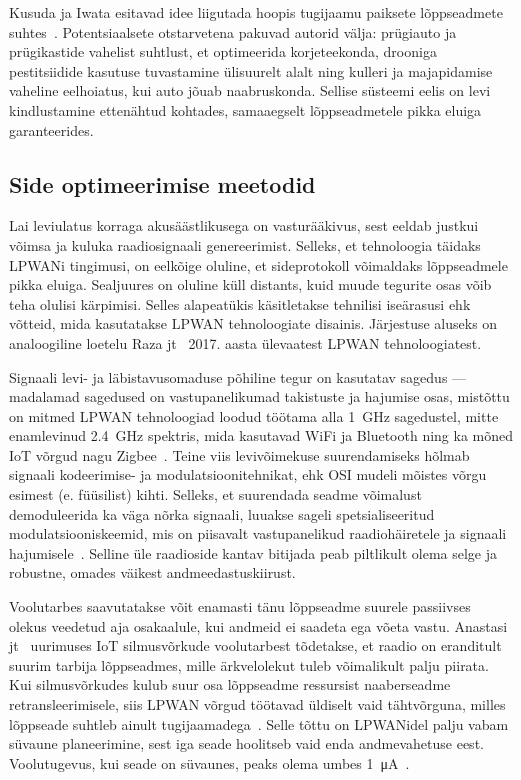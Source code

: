 \documentclass[12pt]{article}
\begin{document}
    Kusuda ja Iwata esitavad idee liigutada hoopis tugijaamu paiksete lõppseadmete suhtes~\cite{kusuda}.
    Potentsiaalsete otstarvetena pakuvad autorid välja: prügiauto ja prügikastide vahelist suhtlust, et optimeerida korjeteekonda, drooniga pestitsiidide kasutuse tuvastamine ülisuurelt alalt ning kulleri ja majapidamise vaheline eelhoiatus, kui auto jõuab naabruskonda.
    Sellise süsteemi eelis on levi kindlustamine ettenähtud kohtades, samaaegselt lõppseadmetele pikka eluiga garanteerides.

    \subsection{Side optimeerimise meetodid}

    Lai leviulatus korraga akusäästlikusega on vasturääkivus, sest eeldab justkui võimsa ja kuluka raadiosignaali genereerimist.
    Selleks, et tehnoloogia täidaks LPWANi tingimusi, on eelkõige oluline, et sideprotokoll võimaldaks lõppseadmele pikka eluiga.
    Sealjuures on oluline küll distants, kuid muude tegurite osas võib teha olulisi kärpimisi.
    Selles alapeatükis käsitletakse tehnilisi iseärasusi ehk võtteid, mida kasutatakse LPWAN tehnoloogiate disainis.
    Järjestuse aluseks on analoogiline loetelu Raza jt~\cite{raza} 2017. aasta ülevaatest LPWAN tehnoloogiatest.

    Signaali levi- ja läbistavusomaduse põhiline tegur on kasutatav sagedus — madalamad sagedused on vastupanelikumad takistuste ja hajumise osas, mistõttu on mitmed LPWAN tehnoloogiad loodud töötama alla \SI{1}{\giga\hertz} sagedustel, mitte enamlevinud \SI{2,4}{\giga\hertz} spektris, mida kasutavad WiFi ja Bluetooth ning ka mõned IoT võrgud nagu Zigbee~\cite{bardyn}.
    Teine viis levivõimekuse suurendamiseks hõlmab signaali kodeerimise- ja modulatsioonitehnikat, ehk OSI mudeli mõistes võrgu esimest (e. füüsilist) kihti. Selleks, et suurendada seadme võimalust demoduleerida ka väga nõrka signaali, luuakse sageli spetsialiseeritud modulatsiooniskeemid, mis on piisavalt vastupanelikud raadiohäiretele ja signaali hajumisele~\cite{reynders}.
    Selline üle raadioside kantav bitijada peab piltlikult olema selge ja robustne, omades väikest andmeedastuskiirust.

    Voolutarbes saavutatakse võit enamasti tänu lõppseadme suurele passiivses olekus veedetud aja osakaalule, kui andmeid ei saadeta ega võeta vastu.
    Anastasi jt~\cite{anastasi} uurimuses IoT silmusvõrkude voolutarbest tõdetakse, et raadio on eranditult suurim tarbija lõppseadmes, mille ärkvelolekut tuleb võimalikult palju piirata.
    Kui silmusvõrkudes kulub suur osa lõppseadme ressursist naaberseadme retransleerimisele, siis LPWAN võrgud töötavad üldiselt vaid tähtvõrguna,  milles lõppseade suhtleb ainult tugijaamadega~\cite{centenaro}.
    Selle tõttu on LPWANidel palju vabam süvaune planeerimine, sest iga seade hoolitseb vaid enda andmevahetuse eest. Voolutugevus, kui seade on süvaunes, peaks olema umbes \SI{1}{\micro\ampere}~\cite{goursaud}.
\end{document}
